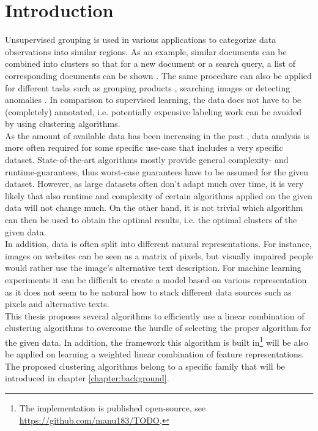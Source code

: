 \chapter{Introduction}


Unsupervised grouping is used in various applications to categorize data observations into similar regions. As an example, similar documents can be combined into clusters so that for a new document or a search query, a list of corresponding documents can be shown \cite{zamir1998web}. The same procedure can also be applied for different tasks such as grouping products \cite{balakrishnan2018product}, searching images \cite{lin2018dimensionality} or detecting anomalies \cite{he2003discovering}. In comparison to supervised learning, the data does not have to be (completely) annotated, i.e. potentially expensive labeling work can be avoided by using clustering algorithms.\\

As the amount of available data has been increasing in the past \cite{wamba2015big}, data analysis is more often required for some specific use-case that includes a very specific dataset. State-of-the-art algorithms mostly provide general complexity- and runtime-guarantees, thus worst-case guarantees have to be assumed for the given dataset. However, as large datasets often don't adapt much over time, it is very likely that also runtime and complexity of certain algorithms applied on the given data will not change much. On the other hand, it is not trivial which algorithm can then be used to obtain the optimal results, i.e. the optimal clusters of the given data.\\

In addition, data is often split into different natural representations. For instance, images on websites can be seen as a matrix of pixels, but visually impaired people would rather use the image's alternative text description. For machine learning experiments it can be difficult to create a model based on various representation as it does not seem to be natural how to stack different data sources such as pixels and alternative texts.\\

This thesis proposes several algorithms to efficiently use a linear combination of clustering algorithms to overcome the hurdle of selecting the proper algorithm for the given data. In addition, the framework this algorithm is built in\footnote{The implementation is published open-source, see \url{https://github.com/manu183/TODO}.} will be also be applied on learning a weighted linear combination of feature representations. The proposed clustering algorithms belong to a specific family that will be introduced in chapter \ref{chapter:background}.